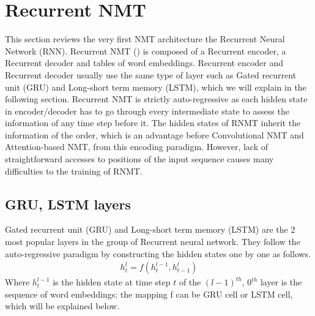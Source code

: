 \section{Recurrent NMT} \label{sec:rrn}
This section reviews the very first NMT architecture the Recurrent Neural Network (RNN). Recurrent NMT () is composed of a Recurrent encoder, a Recurrent decoder and tables of word embeddings. Recurrent encoder and Recurrent decoder usually use the same type of layer such as Gated recurrent unit (GRU) and Long-short term memory (LSTM), which we will explain in the following section. Recurrent NMT is strictly auto-regressive as each hidden state in encoder/decoder has to go through every intermediate state to assess the information of any time step before it. The hidden states of RNMT inherit the information of the order, which is an advantage before Convolutional NMT and Attention-based NMT, from this encoding paradigm. However, lack of straightforward accesses to positions of the input sequence causes many difficulties to the training of RNMT.

\subsection{GRU, LSTM layers}
Gated recurrent unit (GRU) and Long-short term memory (LSTM) are the 2 most popular layers in the group of Recurrent neural network. They follow the auto-regressive paradigm by constructing the hidden states one by one as follows.
\begin{equation}
\begin{array}{rcl}
h^l_t = f(h^{l-1}_t, h^l_{t-1})
\end{array}
\end{equation}
Where $h^{l-1}_t$ is the hidden state at time step $t$ of the $(l-1)^{th}$, $0^{th}$ layer is the sequence of word embeddings; the mapping f can be GRU cell or LSTM cell, which will be explained below.

